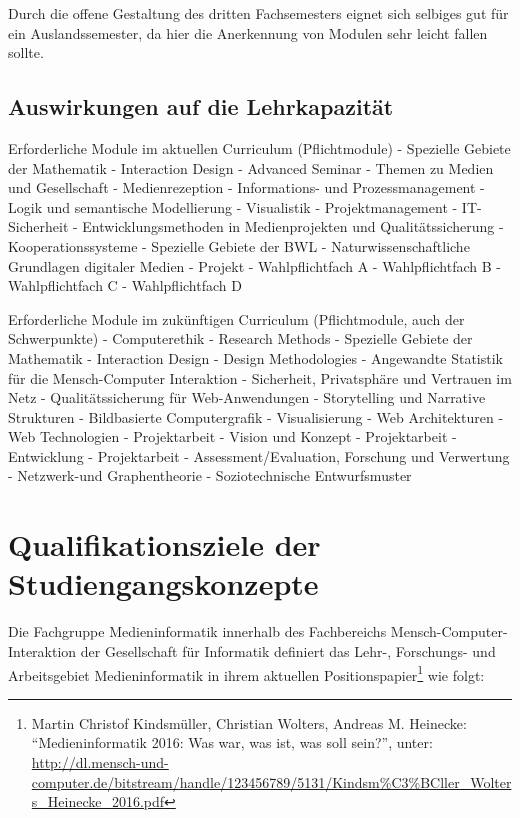 Durch die offene Gestaltung des dritten Fachsemesters eignet sich
selbiges gut für ein Auslandssemester, da hier die Anerkennung von
Modulen sehr leicht fallen sollte.

\section{Auswirkungen auf die
Lehrkapazität}\label{auswirkungen-auf-die-lehrkapazituxe4t-1}

Erforderliche Module im aktuellen Curriculum (Pflichtmodule) - Spezielle
Gebiete der Mathematik - Interaction Design - Advanced Seminar - Themen
zu Medien und Gesellschaft - Medienrezeption - Informations- und
Prozessmanagement - Logik und semantische Modellierung - Visualistik -
Projektmanagement - IT-Sicherheit - Entwicklungsmethoden in
Medienprojekten und Qualitätssicherung - Kooperationssysteme - Spezielle
Gebiete der BWL - Naturwissenschaftliche Grundlagen digitaler Medien -
Projekt - Wahlpflichtfach A - Wahlpflichtfach B - Wahlpflichtfach C -
Wahlpflichtfach D

Erforderliche Module im zukünftigen Curriculum (Pflichtmodule, auch der
Schwerpunkte) - Computerethik - Research Methods - Spezielle Gebiete der
Mathematik - Interaction Design - Design Methodologies - Angewandte
Statistik für die Mensch-Computer Interaktion - Sicherheit, Privatsphäre
und Vertrauen im Netz - Qualitätssicherung für Web-Anwendungen -
Storytelling und Narrative Strukturen - Bildbasierte Computergrafik -
Visualisierung - Web Architekturen - Web Technologien - Projektarbeit -
Vision und Konzept - Projektarbeit - Entwicklung - Projektarbeit -
Assessment/Evaluation, Forschung und Verwertung - Netzwerk-und
Graphentheorie - Soziotechnische Entwurfsmuster

\chapter{Qualifikationsziele der
Studiengangskonzepte}\label{qualifikationsziele-der-studiengangskonzepte}

Die Fachgruppe Medieninformatik innerhalb des Fachbereichs
Mensch-Computer-Interaktion der Gesellschaft für Informatik definiert
das Lehr-, Forschungs- und Arbeitsgebiet Medieninformatik in ihrem
aktuellen Positionspapier\footnote{Martin Christof Kindsmüller,
  Christian Wolters, Andreas M. Heinecke: ``Medieninformatik 2016: Was
  war, was ist, was soll sein?'', unter:
  \url{http://dl.mensch-und-computer.de/bitstream/handle/123456789/5131/Kindsm\%C3\%BCller_Wolters_Heinecke_2016.pdf}}
wie folgt:


